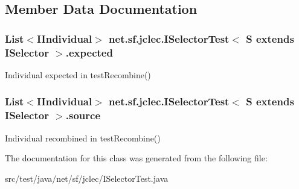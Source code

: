 \subsection{Member Data Documentation}
\hypertarget{classnet_1_1sf_1_1jclec_1_1_i_selector_test_3_01_s_01extends_01_i_selector_01_4_a0d5e22fffea96c580353be00c241a56d}{
\subsubsection[{expected}]{\setlength{\rightskip}{0pt plus 5cm}List$<${\bf I\-Individual}$>$ net.\-sf.\-jclec.\-I\-Selector\-Test$<$ S extends {\bf I\-Selector} $>$.expected\hspace{0.3cm}{\ttfamily [protected]}}}\label{classnet_1_1sf_1_1jclec_1_1_i_selector_test_3_01_s_01extends_01_i_selector_01_4_a0d5e22fffea96c580353be00c241a56d}
Individual expected in test\-Recombine() \hypertarget{classnet_1_1sf_1_1jclec_1_1_i_selector_test_3_01_s_01extends_01_i_selector_01_4_a81260330632552e86e63da08b23bbf99}{
\subsubsection[{source}]{\setlength{\rightskip}{0pt plus 5cm}List$<${\bf I\-Individual}$>$ net.\-sf.\-jclec.\-I\-Selector\-Test$<$ S extends {\bf I\-Selector} $>$.source\hspace{0.3cm}{\ttfamily [protected]}}}\label{classnet_1_1sf_1_1jclec_1_1_i_selector_test_3_01_s_01extends_01_i_selector_01_4_a81260330632552e86e63da08b23bbf99}
Individual recombined in test\-Recombine() 

The documentation for this class was generated from the following file\-:\begin{DoxyCompactItemize}
\item 
src/test/java/net/sf/jclec/I\-Selector\-Test.\-java\end{DoxyCompactItemize}

